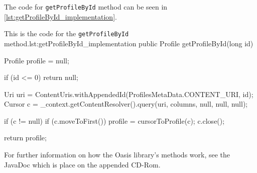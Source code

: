 The code for \texttt{getProfileById} method can be seen in \autoref{lst:getProfileById_implementation}.

\begin{Java}{This is the code for the \texttt{getProfileById} method.}{lst:getProfileById_implementation}
public Profile getProfileById(long id) {
	Profile profile = null;
	
	if (id <= 0) {
		return null;
	}
	
	Uri uri = ContentUris.withAppendedId(ProfilesMetaData.CONTENT_URI, id);
	Cursor c = _context.getContentResolver().query(uri, columns, null, null, null);

	if (c != null) {
		if (c.moveToFirst()) {
			profile = cursorToProfile(c);
		}
		c.close();
	}

	return profile;
}
\end{Java}

For further information on how the Oasis library's methods work, see the JavaDoc which is place on the appended CD-Rom.